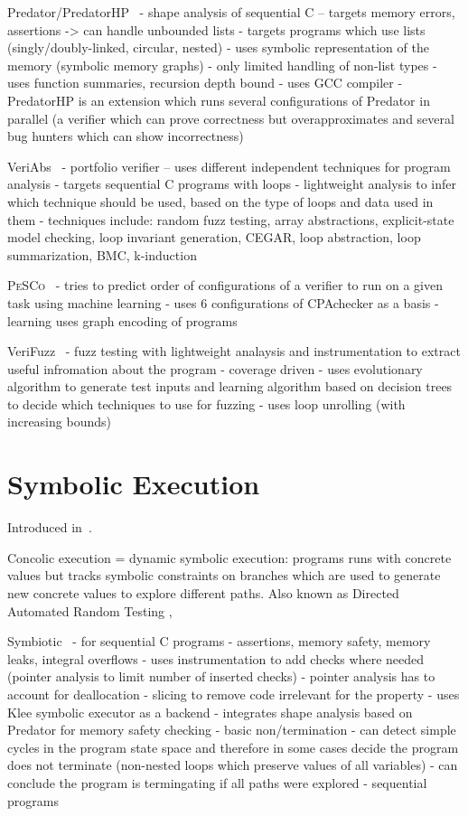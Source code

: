 Predator/PredatorHP~
- shape analysis of sequential C -- targets memory errors, assertions -> can handle unbounded lists
  - targets programs which use lists (singly/doubly-linked, circular, nested)
  - uses symbolic representation of the memory (symbolic memory graphs)
- only limited handling of non-list types
- uses function summaries, recursion depth bound
- uses GCC compiler
- PredatorHP is an extension which runs several configurations of Predator in parallel (a verifier which can prove correctness but overapproximates and several bug hunters which can show incorrectness)

VeriAbs~
- portfolio verifier -- uses different independent techniques for program analysis
- targets sequential C programs with loops
- lightweight analysis to infer which technique should be used, based on the type of loops and data used in them
- techniques include: random fuzz testing, array abstractions, explicit-state model checking, loop invariant generation, CEGAR, loop abstraction, loop summarization, BMC, k-induction

\textsc{PeSCo}~
- tries to predict order of configurations of a verifier to run on a given task using machine learning
- uses 6 configurations of CPAchecker as a basis
- learning uses graph encoding of programs

VeriFuzz~
- fuzz testing with lightweight analaysis and instrumentation to extract useful infromation about the program
- coverage driven
- uses evolutionary algorithm to generate test inputs and learning algorithm based on decision trees to decide which techniques to use for fuzzing
- uses loop unrolling (with increasing bounds)

\section{Symbolic Execution}

Introduced in~.

Concolic execution = dynamic symbolic execution: programs runs with concrete values but tracks symbolic constraints on branches which are used to generate new concrete values to explore different paths. Also known as Directed Automated Random Testing , 


Symbiotic~
- for sequential C programs
- assertions, memory safety, memory leaks, integral overflows
- uses instrumentation to add checks where needed (pointer analysis to limit number of inserted checks)
  - pointer analysis has to account for deallocation
- slicing to remove code irrelevant for the property 
- uses Klee symbolic executor as a backend
- integrates shape analysis based on Predator\cite{TODO} for memory safety checking
- basic non/termination
    - can detect simple cycles in the program state space and therefore in some cases decide the program does not terminate (non-nested loops which preserve values of all variables)
    - can conclude the program is termingating if all paths were explored
- sequential programs

